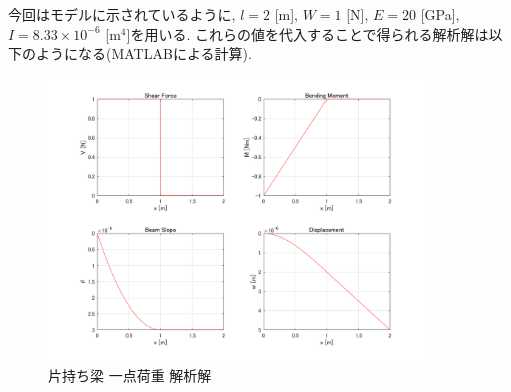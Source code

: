 \documentclass{jsarticle}
\begin{document}
今回はモデルに示されているように, $l=2$ [m], $W=1$ [N], $E=20$ [GPa], $I=8.33\times10^{-6}$ [m$^4$]を用いる. これらの値を代入することで得られる解析解は以下のようになる(MATLABによる計算).

\begin{figure}[H]
\begin{center}
\includegraphics[width=10cm]{Cantilever_One_Beam.png}
\caption{片持ち梁 一点荷重 解析解}
\end{center}
\end{figure}
\end{document}

